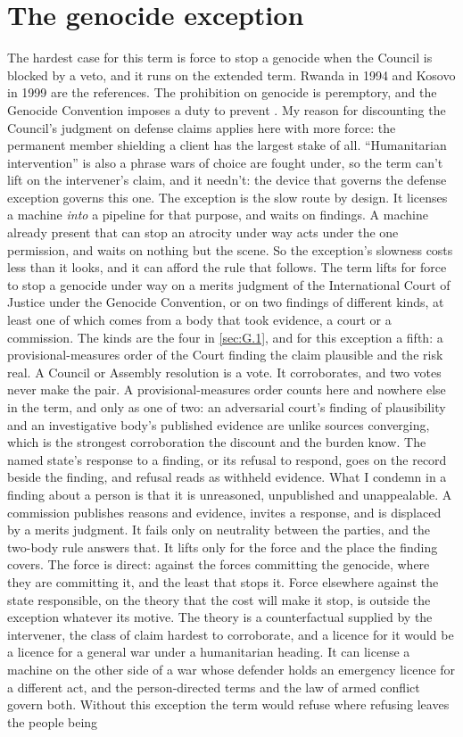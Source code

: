 \section{The genocide exception}
\label{sec:G.4}
The hardest case for this term is force to stop a genocide when the Council is blocked by a veto, and it runs on the extended term. Rwanda in 1994 and Kosovo in 1999 are the references. The prohibition on genocide is peremptory, and the Genocide Convention imposes a duty to prevent \autocite{icj2007bosnia}. My reason for discounting the Council's judgment on defense claims applies here with more force: the permanent member shielding a client has the largest stake of all. “Humanitarian intervention” is also a phrase wars of choice are fought under, so the term can't lift on the intervener's claim, and it needn't: the device that governs the defense exception governs this one. The exception is the slow route by design. It licenses a machine \emph{into} a pipeline for that purpose, and waits on findings. A machine already present that can stop an atrocity under way acts under the one permission, and waits on nothing but the scene. So the exception's slowness costs less than it looks, and it can afford the rule that follows. The term lifts for force to stop a genocide under way on a merits judgment of the International Court of Justice under the Genocide Convention, or on two findings of different kinds, at least one of which comes from a body that took evidence, a court or a commission. The kinds are the four in \ref{sec:G.1}, and for this exception a fifth: a provisional-measures order of the Court finding the claim plausible and the risk real. A Council or Assembly resolution is a vote. It corroborates, and two votes never make the pair. A provisional-measures order counts here and nowhere else in the term, and only as one of two: an adversarial court's finding of plausibility and an investigative body's published evidence are unlike sources converging, which is the strongest corroboration the discount and the burden know. The named state's response to a finding, or its refusal to respond, goes on the record beside the finding, and refusal reads as withheld evidence. What I condemn in a finding about a person is that it is unreasoned, unpublished and unappealable. A commission publishes reasons and evidence, invites a response, and is displaced by a merits judgment. It fails only on neutrality between the parties, and the two-body rule answers that. It lifts only for the force and the place the finding covers. The force is direct: against the forces committing the genocide, where they are committing it, and the least that stops it. Force elsewhere against the state responsible, on the theory that the cost will make it stop, is outside the exception whatever its motive. The theory is a counterfactual supplied by the intervener, the class of claim hardest to corroborate, and a licence for it would be a licence for a general war under a humanitarian heading. It can license a machine on the other side of a war whose defender holds an emergency licence for a different act, and the person-directed terms and the law of armed conflict govern both. Without this exception the term would refuse where refusing leaves the people being 